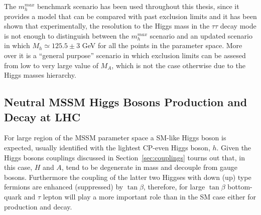 The $m_h^{max}$ benchmark scenario has been used throughout this thesis, since it provides a model that can be compared with past exclusion limits
and it has been shown that experimentally, the resolution to the Higgs mass in the $\tau\tau$ decay mode is not enough to distinguish between
the $m_h^{max}$ scenario and an updated  scenario in which $M_h \simeq 125.5 \pm 3 $ GeV for all the points in the parameter space. More over
it is a ``general purpose'' scenario in which exclusion limits can be assesed from low to very large value of $M_A$, which is not the case
otherwise due to the Higgs masses hierarchy.


 


\subsection{Neutral MSSM Higgs Bosons Production and Decay at LHC}
For large region of the MSSM parameter space a SM-like Higgs boson is expected, usually identified with the lightest 
CP-even Higgs boson, $h$. 
Given the Higgs bosons couplings discussed in Section~\ref{sec:couplings} tourns out that, in this case, $H$ and $A$, 
tend to be degenerate in mass and decouple from gauge bosons. Furthermore the coupling of the latter
two Higgses with down (up) type fermions are enhanced (suppressed) by $\tan\beta$, therefore, for large $\tan\beta$
bottom-quark and $\tau$ lepton will play a more important role than in
the SM case either for production and decay. 

